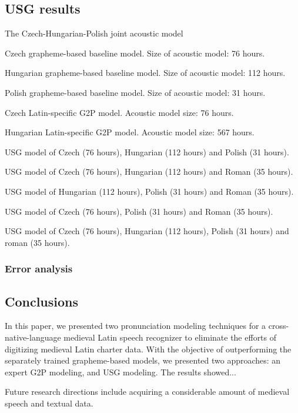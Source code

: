 \documentclass[runningheads,a4paper]{llncs}
\begin{document}
\subsection{USG results}
The Czech-Hungarian-Polish joint acoustic model
\begin{table}
\parbox{.45\linewidth}{
\centering
\caption{Czech grapheme-based baseline model. Size of acoustic model: 76 hours.}

}
\hfill
\parbox{.45\linewidth}{
\centering
\caption{Hungarian grapheme-based baseline model. Size of acoustic model: 112 hours.}

}
\hfill
\parbox{.45\linewidth}{
\centering
\caption{Polish grapheme-based baseline model. Size of acoustic model: 31 hours.}

}
\hfill
\parbox{.45\linewidth}{
\centering
\caption{Czech Latin-specific G2P model. Acoustic model size: 76 hours.}

}
\hfill
\parbox{.45\linewidth}{
\centering
\caption{Hungarian Latin-specific G2P model. Acoustic model size: 567 hours.}

}
\hfill
\parbox{.45\linewidth}{
\centering
\caption{USG model of Czech (76 hours), Hungarian (112 hours) and Polish (31 hours).}

}
\hfill
\parbox{.45\linewidth}{
\centering
\caption{USG model of Czech (76 hours), Hungarian (112 hours) and Roman (35 hours).}

}
\hfill
\parbox{.45\linewidth}{
\centering
\caption{USG model of Hungarian (112 hours), Polish (31 hours) and Roman (35 hours).}

}
\hfill
\parbox{.45\linewidth}{
\centering
\caption{USG model of Czech (76 hours), Polish (31 hours) and Roman (35 hours).}

}
\hfill
\parbox{.45\linewidth}{
\centering
\caption{USG model of Czech (76 hours), Hungarian (112 hours), Polish (31 hours) and roman (35 hours).}

}
\end{table}
\subsubsection{Error analysis}
\subsection{Conclusions}
In this paper, we presented two pronunciation modeling techniques for a cross-native-language medieval Latin speech recognizer to eliminate the efforts of digitizing medieval Latin charter data.
With the objective of outperforming the separately trained grapheme-based models, we presented two approaches: an expert G2P modeling, and USG modeling.
The results showed...

Future research directions include acquiring a considerable amount of medieval speech and textual data.



\end{document}
